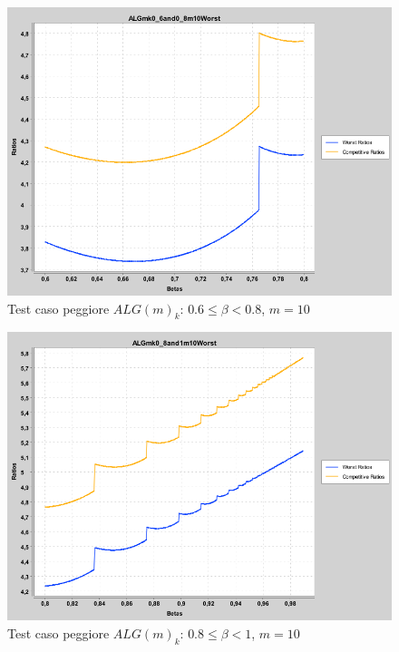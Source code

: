 \documentclass[twoside,openany,titlepage,fleqn,
	headinclude,12pt,a4paper,BCOR5mm,footinclude]{scrbook}
\begin{document}
\begin{figure}[H]
\caption[Test caso peggiore $ALG(m)_{k}$: $0.6 \leq \beta < 0.8$]{Test caso peggiore $ALG(m)_{k}$: $0.6 \leq \beta < 0.8$, $m = 10$}
\centering
\includegraphics[scale=0.4]{worst/ALGmk0_6and0_8m10Worst.png}
\end{figure}
\begin{figure}[H]
\caption[Test caso peggiore $ALG(m)_{k}$: $0.8 \leq \beta < 1$]{Test caso peggiore $ALG(m)_{k}$: $0.8 \leq \beta < 1$, $m = 10$}
\centering
\includegraphics[scale=0.4]{worst/ALGmk0_8and1m10Worst.png}
\end{figure}


\end{document}

